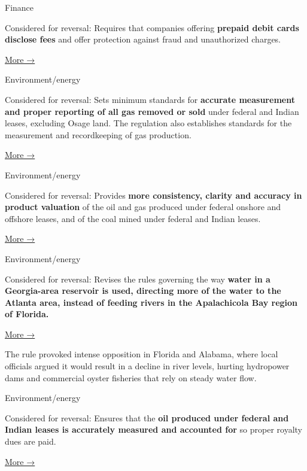 Finance

Considered for reversal: Requires that companies offering
\textbf{prepaid debit cards disclose fees} and offer protection against
fraud and unauthorized charges.

\href{https://www.nytimes3xbfgragh.onion/2016/10/05/business/prepaid-debit-cards-users-will-get-new-federal-protections.html}{More
→}

Environment/energy

Considered for reversal: Sets minimum standards for \textbf{accurate
measurement and proper reporting of all gas removed or sold} under
federal and Indian leases, excluding Osage land. The regulation also
establishes standards for the measurement and recordkeeping of gas
production.

\href{https://www.federalregister.gov/documents/2016/11/17/2016-25410/onshore-oil-and-gas-operations-federal-and-indian-oil-and-gas-leases-measurement-of-gas}{More
→}

Environment/energy

Considered for reversal: Provides \textbf{more consistency, clarity and
accuracy in product valuation} of the oil and gas produced under federal
onshore and offshore leases, and of the coal mined under federal and
Indian leases.

\href{https://www.federalregister.gov/documents/2016/07/01/2016-15420/consolidated-federal-oil-and-gas-and-federal-and-indian-coal-valuation-reform}{More
→}

Environment/energy

Considered for reversal: Revises the rules governing the way
\textbf{water in a Georgia-area reservoir is used, directing more of the
water to the Atlanta area, instead of feeding rivers in the Apalachicola
Bay region of Florida.}

\href{http://www.sam.usace.army.mil/Missions/Planning-Environmental/ACF-Master-Water-Control-Manual-Update/}{More
→}

The rule provoked intense opposition in Florida and Alabama, where local
officials argued it would result in a decline in river levels, hurting
hydropower dams and commercial oyster fisheries that rely on steady
water flow.

Environment/energy

Considered for reversal: Ensures that the \textbf{oil produced under
federal and Indian leases is accurately measured and accounted for} so
proper royalty dues are paid.

\href{https://www.federalregister.gov/documents/2016/11/17/2016-25405/onshore-oil-and-gas-operations-federal-and-indian-oil-and-gas-leases-measurement-of-oil}{More
→}

